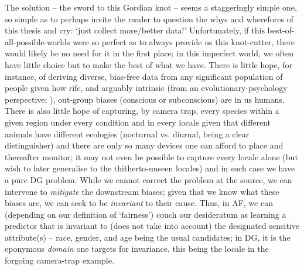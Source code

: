 %
%
The solution -- the sword to this Gordian knot -- seems a staggeringly simple one, so simple as to
perhaps invite the reader to question the whys and wherefores of this thesis and cry: `just collect
more/better data!'
%
Unfortunately, if this best-of-all-possible-worlds were so perfect as to always provide us this
knot-cutter, there would likely be no need for it in the first place; in this imperfect world, we
often have little choice but to make the best of what we have. 
%
There is little hope, for instance, of deriving diverse, bias-free data from any significant
population of people given how rife, and arguably intrinsic (from an evolutionary-psychology
perspective; \cite{kurzban2001evolutionary}), out-group biases (conscious or subconscious) are in
us humans.
%
There is also little hope of capturing, by camera trap, every species within a given region under
every condition and in every locale given that different animals have different ecologies
(nocturnal vs. diurnal, being a clear distinguisher) and there are only so many devices one can
afford to place and thereafter monitor; it may not even be possible to capture every locale alone
(but wish to later generalise to the thitherto-unseen locales) and in such case we have a pure DG
problem.
%
While we cannot correct the problem at the source, we can intervene to \emph{mitigate} the
downstream biases; given that we know what these biases are, we can seek to be \emph{invariant} to
their cause.
%
Thus, in AF, we can (depending on our definition of `fairness') couch our desideratum as learning a
predictor that is invariant to (does not take into account) the designated sensitive attribute(s)
-- race, gender, and age being the usual candidates; in DG, it is the eponymous \emph{domain} one
targets for invariance, this being the locale in the forgoing camera-trap example.

